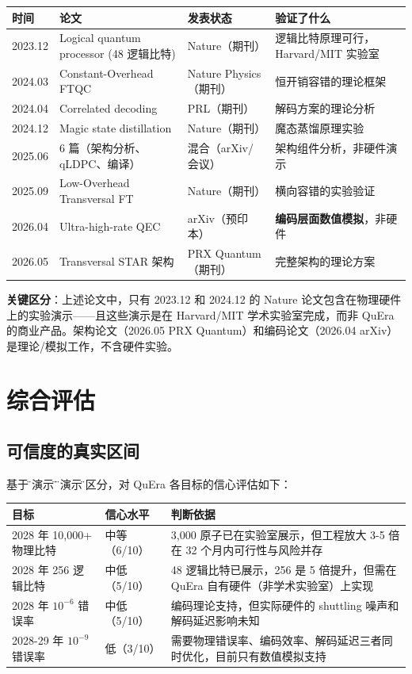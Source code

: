 \documentclass[11pt,a4paper]{ctexart}
\begin{document}
\begin{center}
\begin{tabular}{p{3cm}p{5.5cm}p{2.5cm}p{4cm}}
\toprule
\textbf{时间} & \textbf{论文} & \textbf{发表状态} & \textbf{验证了什么} \\
\midrule
2023.12 & Logical quantum processor (48 逻辑比特) & Nature（期刊） & 逻辑比特原理可行，Harvard/MIT 实验室 \\
2024.03 & Constant-Overhead FTQC & Nature Physics（期刊） & 恒开销容错的理论框架 \\
2024.04 & Correlated decoding & PRL（期刊） & 解码方案的理论分析 \\
2024.12 & Magic state distillation & Nature（期刊） & 魔态蒸馏原理实验 \\
2025.06 & 6 篇（架构分析、qLDPC、编译） & 混合（arXiv/会议） & 架构组件分析，非硬件演示 \\
2025.09 & Low-Overhead Transversal FT & Nature（期刊） & 横向容错的实验验证 \\
2026.04 & Ultra-high-rate QEC & arXiv（预印本） & \textbf{编码层面数值模拟}，非硬件 \\
2026.05 & Transversal STAR 架构 & PRX Quantum（期刊） & 完整架构的理论方案 \\
\bottomrule
\end{tabular}
\end{center}

\textbf{关键区分}：上述论文中，只有 2023.12 和 2024.12 的 Nature 论文包含在物理硬件上的实验演示——且这些演示是在 Harvard/MIT 学术实验室完成，而非 QuEra 的商业产品。架构论文（2026.05 PRX Quantum）和编码论文（2026.04 arXiv）是理论/模拟工作，不含硬件实验。

\section{综合评估}

\subsection{可信度的真实区间}

基于\"已演示\"与\"未演示\"的区分，对 QuEra 各目标的信心评估如下：

\begin{center}
\begin{tabular}{p{5cm}p{3cm}p{8cm}}
\toprule
\textbf{目标} & \textbf{信心水平} & \textbf{判断依据} \\
\midrule
2028 年 10,000+ 物理比特 & 中等（6/10） & 3,000 原子已在实验室展示，但工程放大 3-5 倍在 32 个月内可行性与风险并存 \\
2028 年 256 逻辑比特 & 中低（5/10） & 48 逻辑比特已展示，256 是 5 倍提升，但需在 QuEra 自有硬件（非学术实验室）上实现 \\
2028 年 $10^{-6}$ 错误率 & 中低（5/10） & 编码理论支持，但实际硬件的 shuttling 噪声和解码延迟影响未知 \\
2028-29 年 $10^{-9}$ 错误率 & 低（3/10） & 需要物理错误率、编码效率、解码延迟三者同时优化，目前只有数值模拟支持 \\
\bottomrule
\end{tabular}
\end{center}
\end{document}
